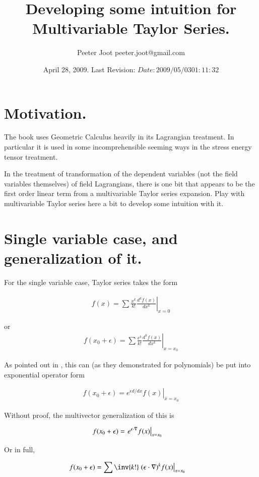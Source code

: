 \documentclass{article}
\title{ Developing some intuition for Multivariable Taylor Series. }
\author{Peeter Joot \quad peeter.joot@gmail.com }
\date{ April 28, 2009.  Last Revision: $Date: 2009/05/03 01:11:32 $ }
\begin{document}
\maketitle{}
\tableofcontents
\section{ Motivation. }

The book \cite{doran2003gap} uses Geometric Calculus heavily in its 
Lagrangian treatment.  In particular it is used in some incomprehensible seeming ways in the 
stress energy tensor treatment.

In the treatment of transformation of the dependent variables (not the field
variables themselves) of field Lagrangians, there is one bit that
appears to be the first order linear term from a multivariable Taylor
series expansion.  Play with multivariable Taylor series here a bit
to develop some intuition with it.

\section{ Single variable case, and generalization of it. }

For the single variable case, Taylor series takes the form

\begin{align}
f(x) = \sum \frac{x^k}{k!} \left. \frac{d^k f(x)}{dx^k} \right\vert_{x=0}
\end{align}

or
\begin{align}
f(x_0 + \epsilon) = \sum \frac{\epsilon^k}{k!} \left. \frac{d^k f(x)}{dx^k} \right\vert_{x=x_0}
\end{align}

As pointed out in \cite{byron1992mca}, this can (as they demonstrated for polynomials) be put into exponential 
operator form

\begin{align}
f(x_0 + \epsilon) = \left. e^{\epsilon d/dx} f(x) \right\vert_{x=x_0}
\end{align}

Without proof, the multivector generalization of this is

\begin{align}
f(x_0 + \epsilon) 
&= \left. e^{\epsilon \cdot \nabla} f(x) \right\vert_{x=x_0} 
\end{align}

Or in full,

\begin{align}\label{eqn:taylorMulti}
f(x_0 + \epsilon) 
&= \sum \inv{k!} \left. {(\epsilon \cdot \grad)^k} f(x) \right\vert_{x=x_0}
\end{align}
\end{document}
